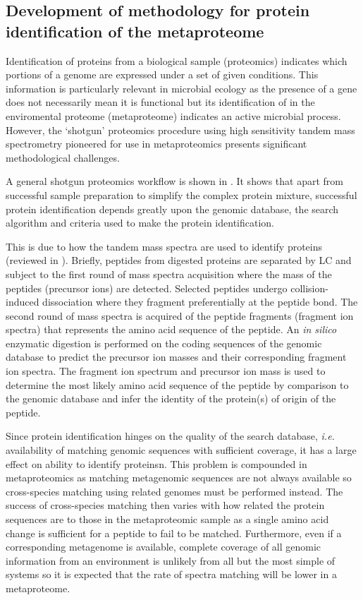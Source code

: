 
\subsection[Development of methodology for protein identification of the metaproteome]{Development of methodology for protein identification of the metaproteome}

Identification of proteins from a biological sample (proteomics) indicates which portions of a genome are expressed under a set of given conditions.
This information is particularly relevant in microbial ecology as the presence of a gene does not necessarily mean it is functional but its identification of in the enviromental proteome (metaproteome) indicates an active microbial process.
However, the `shotgun' proteomics procedure using high sensitivity tandem mass spectrometry pioneered for use in metaproteomics \cite{Ram2005} presents significant methodological challenges.

A general shotgun proteomics workflow is shown in .
It shows that apart from successful sample preparation to simplify the complex protein mixture, successful protein identification depends greatly upon the genomic database, the search algorithm and criteria used to make the protein identification.

This is due to how the tandem mass spectra are used to identify proteins (reviewed in \citet{Marcotte2007}).
Briefly, peptides from digested proteins are separated by \ac{LC} and subject to the first round of mass spectra acquisition where the mass of the peptides (precursor ions) are detected.
Selected peptides undergo collision-induced dissociation where they fragment preferentially at the peptide bond.
The second round of mass spectra is acquired of the peptide fragments (fragment ion spectra) that represents the amino acid sequence of the peptide.
An \emph{in silico} enzymatic digestion is performed on the coding sequences of the genomic database to predict the precursor ion masses and their corresponding fragment ion spectra.
The fragment ion spectrum and precursor ion mass is used to determine the most likely amino acid sequence of the peptide by comparison to the genomic database and infer the identity of the protein(s) of origin of the peptide.

Since protein identification hinges on the quality of the search database, \emph{i.e.} availability of matching genomic sequences with sufficient coverage, it has a large effect on ability to identify proteinsn.
This problem is compounded in metaproteomics as matching metagenomic sequences are not always available so cross-species matching using related genomes must be performed instead.
The success of cross-species matching then varies with how related the protein sequences are to those in the metaproteomic sample as a single amino acid change is sufficient for a peptide to fail to be matched.
Furthermore, even if a corresponding metagenome is available, complete coverage of all genomic information from an environment is unlikely from all but the most simple of systems so it is expected that the rate of spectra matching will be lower in a metaproteome.

